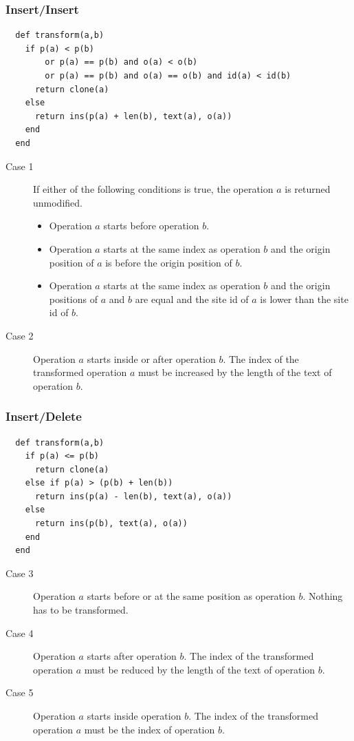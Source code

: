 \subsubsection{Insert/Insert}

\small{\begin{verbatim}
  def transform(a,b)
    if p(a) < p(b) 
        or p(a) == p(b) and o(a) < o(b) 
        or p(a) == p(b) and o(a) == o(b) and id(a) < id(b)
      return clone(a)
    else
      return ins(p(a) + len(b), text(a), o(a))
    end
  end
\end{verbatim}}

\begin{description}
 \item[Case 1] If either of the following conditions is true, the operation $a$ is returned unmodified.
 \begin{itemize}
  \item Operation $a$ starts before operation $b$.
  \item Operation $a$ starts at the same index as operation $b$ and the origin position of $a$ is before the origin position of $b$.
  \item Operation $a$ starts at the same index as operation $b$ and the origin positions of $a$ and $b$ are equal and the site id of $a$ is lower than the site id of $b$.
 \end{itemize}
 \item[Case 2] Operation $a$ starts inside or after operation $b$. The index of the transformed operation $a$ must be increased by the length of the text of operation $b$.
\end{description}


\subsubsection{Insert/Delete}

\small{\begin{verbatim}
  def transform(a,b)
    if p(a) <= p(b)
      return clone(a)
    else if p(a) > (p(b) + len(b))
      return ins(p(a) - len(b), text(a), o(a))
    else 
      return ins(p(b), text(a), o(a))
    end
  end
\end{verbatim}}

\begin{description}
 \item[Case 3] Operation $a$ starts before or at the same position as operation $b$. Nothing has to be transformed.
 \item[Case 4] Operation $a$ starts after operation $b$. The index of the transformed operation $a$ must be reduced by the length of the text of operation $b$.
 \item[Case 5] Operation $a$ starts inside operation $b$. The index of the transformed operation $a$ must be the index of operation $b$.
\end{description}



